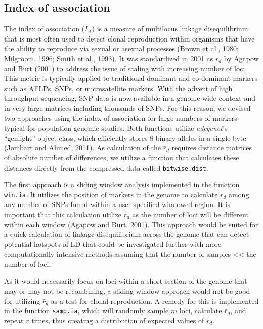 \documentclass[double,12pt]{beavtex}
\begin{document}
  \subsection{Index of association}\label{index-of-association-1}
  
  The index of association (\(I_A\)) is a measure of multilocus linkage
  disequilibrium that is most often used to detect clonal reproduction
  within organisms that have the ability to reproduce via sexual or
  asexual processes (Brown et al.,
  \protect\hyperlink{ref-brown1980multilocus}{1980}; Milgroom,
  \protect\hyperlink{ref-milgroom1996recombination}{1996}; Smith et al.,
  \protect\hyperlink{ref-smith1993how}{1993}). It was standardized in 2001
  as \(\bar{r}_d\) by Agapow and Burt
  (\protect\hyperlink{ref-Agapowux5f2001}{2001}) to address the issue of
  scaling with increasing number of loci. This metric is typically applied
  to traditional dominant and co-dominant markers such as AFLPs, SNPs, or
  microsatellite markers. With the advent of high throughput sequencing,
  SNP data is now available in a genome-wide context and in very large
  matrices including thousands of SNPs. For this reason, we devised two
  approaches using the index of association for large numbers of markers
  typical for population genomic studies. Both functions utilize
  \emph{adegenet}'s ``genlight'' object class, which efficiently stores 8
  binary alleles in a single byte (Jombart and Ahmed,
  \protect\hyperlink{ref-jombart2011adegenet}{2011}). As calculation of
  the \(\bar{r}_d\) requires distance matrices of absolute number of
  differences, we utilize a function that calculates these distances
  directly from the compressed data called \texttt{bitwise.dist}.
  
  The first approach is a sliding window analysis implemented in the
  function \texttt{win.ia}. It utilizes the position of markers in the
  genome to calculate \(\bar{r}_d\) among any number of SNPs found within
  a user-specified windowed region. It is important that this calculation
  utilize \(\bar{r}_d\) as the number of loci will be different within
  each window (Agapow and Burt,
  \protect\hyperlink{ref-Agapowux5f2001}{2001}). This approach would be
  suited for a quick calculation of linkage disequilibrium across the
  genome that can detect potential hotspots of LD that could be
  investigated further with more computationally intensive methods
  assuming that the number of samples \textless{}\textless{} the number of
  loci.
  
  As it would necessarily focus on loci within a short section of the
  genome that may or may not be recombining, a sliding window approach
  would not be good for utilizing \(\bar{r}_d\) as a test for clonal
  reproduction. A remedy for this is implemented in the function
  \texttt{samp.ia}, which will randomly sample \(m\) loci, calculate
  \(\bar{r}_d\), and repeat \(r\) times, thus creating a distribution of
  expected values of \(\bar{r}_d\).
  
\end{document}
